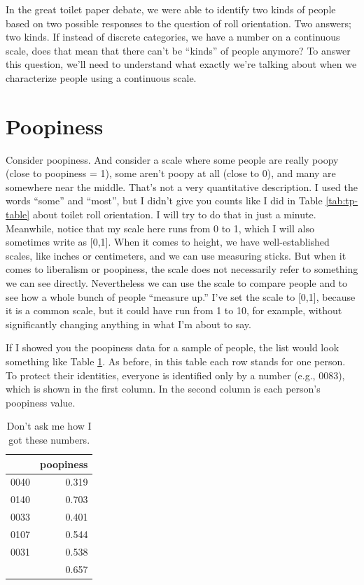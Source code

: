 \documentclass[
  openany]{book}
\begin{document}
In the great toilet paper debate, we were able to identify two kinds of people based on two possible responses to the question of roll orientation. Two answers; two kinds. If instead of discrete categories, we have a number on a continuous scale, does that mean that there can't be ``kinds'' of people anymore? To answer this question, we'll need to understand what exactly we're talking about when we characterize people using a continuous scale.

\hypertarget{poopiness}{%
\section*{Poopiness}\label{poopiness}}

Consider poopiness. And consider a scale where some people are really poopy (close to poopiness = 1), some aren't poopy at all (close to 0), and many are somewhere near the middle. That's not a very quantitative description. I used the words ``some'' and ``most'', but I didn't give you counts like I did in Table \ref{tab:tp-table} about toilet roll orientation. I will try to do that in just a minute. Meanwhile, notice that my scale here runs from 0 to 1, which I will also sometimes write as {[}0,1{]}. When it comes to height, we have well-established scales, like inches or centimeters, and we can use measuring sticks. But when it comes to liberalism or poopiness, the scale does not necessarily refer to something we can see directly. Nevertheless we can use the scale to compare people and to see how a whole bunch of people ``measure up.'' I've set the scale to {[}0,1{]}, because it is a common scale, but it could have run from 1 to 10, for example, without significantly changing anything in what I'm about to say.

If I showed you the poopiness data for a sample of people, the list would look something like Table \ref{tab:poopy-counts}. As before, in this table each row stands for one person. To protect their identities, everyone is identified only by a number (e.g., 0083), which is shown in the first column. In the second column is each person's poopiness value.

\begin{table}[!h]

\caption{\label{tab:poopy-counts}Don't ask me how I got these numbers.}
\centering
\begin{tabular}[t]{lr}
\toprule
  & poopiness\\
\midrule
0040 & 0.319\\
0140 & 0.703\\
0033 & 0.401\\
0107 & 0.544\\
0031 & 0.538\\
\addlinespace
0100 & 0.657\\
\bottomrule
\end{tabular}
\end{table}
\end{document}
